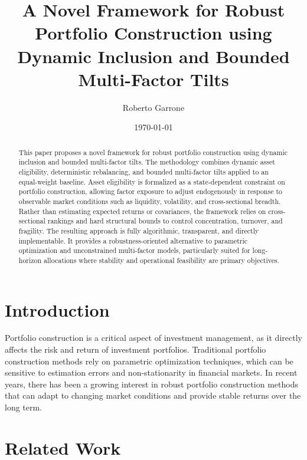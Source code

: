 \documentclass{article}
\begin{document}
\title{A Novel Framework for Robust Portfolio Construction using Dynamic Inclusion and Bounded Multi-Factor Tilts}

\author{Roberto Garrone}

\date{\today}

\maketitle

\begin{abstract}
This paper proposes a novel framework for robust portfolio construction using dynamic inclusion and bounded multi-factor tilts. The methodology combines dynamic asset eligibility, deterministic rebalancing, and bounded multi-factor tilts applied to an equal-weight baseline. Asset eligibility is formalized as a state-dependent constraint on portfolio construction, allowing factor exposure to adjust endogenously in response to observable market conditions such as liquidity, volatility, and cross-sectional breadth. Rather than estimating expected returns or covariances, the framework relies on cross-sectional rankings and hard structural bounds to control concentration, turnover, and fragility. The resulting approach is fully algorithmic, transparent, and directly implementable. It provides a robustness-oriented alternative to parametric optimization and unconstrained multi-factor models, particularly suited for long-horizon allocations where stability and operational feasibility are primary objectives.
\end{abstract}

\section{Introduction}

Portfolio construction is a critical aspect of investment management, as it directly affects the risk and return of investment portfolios. Traditional portfolio construction methods rely on parametric optimization techniques, which can be sensitive to estimation errors and non-stationarity in financial markets. In recent years, there has been a growing interest in robust portfolio construction methods that can adapt to changing market conditions and provide stable returns over the long term.

\section{Related Work}
\end{document}
